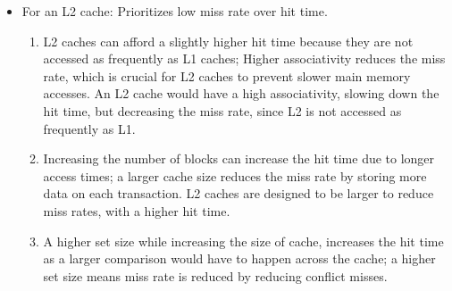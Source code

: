 \documentclass{article}
\begin{document}
\begin{enumerate}
\begin{itemize}
\begin{enumerate}
		\end{enumerate}
		\item For an L2 cache: Prioritizes low miss rate over hit time.
		\begin{enumerate}
			\item  L2 caches can afford a slightly higher hit time because they are not accessed as frequently as L1 caches; Higher associativity reduces the miss rate, which is crucial for L2 caches to prevent slower main memory accesses. An L2 cache would have a high associativity, slowing down the hit time, but decreasing the miss rate, since L2 is not accessed as frequently as L1. 
			\item Increasing the number of blocks can increase the hit time due to longer access times; a larger cache size reduces the miss rate by storing more data on each transaction. L2 caches are designed to be larger to reduce miss rates, with a higher hit time.
			\item A higher set size while increasing the size of cache, increases the hit time as a larger comparison would have to happen across the cache; a higher set size means miss rate is reduced by reducing conflict misses.
		\end{enumerate}
	\end{itemize}
\end{enumerate}
\end{document}

